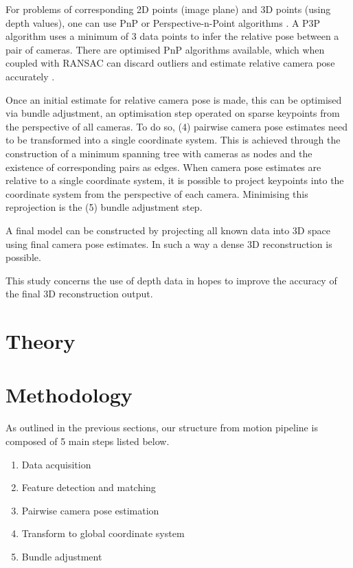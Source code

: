 \documentclass[10pt,twocolumn,letterpaper]{article}
\begin{document}
For problems of corresponding 2D points (image plane) and 3D points (using depth
values), one can use PnP or Perspective-n-Point algorithms \cite{d2013p3p}. A P3P
algorithm uses a minimum of 3 data points to infer the relative pose between a
pair of cameras. There are optimised PnP algorithms available, which when
coupled with RANSAC can discard outliers and estimate relative camera pose
accurately \cite{lepetit2009epnp}.

Once an initial estimate for relative camera pose is made, this can be optimised
via bundle adjustment, an optimisation step operated on sparse keypoints from
the perspective of all cameras. To do so, (4) pairwise camera pose estimates
need to be transformed into a single coordinate system. This is achieved through
the construction of a minimum spanning tree with cameras as nodes and the
existence of corresponding pairs as edges. When camera pose estimates are
relative to a single coordinate system, it is possible to project keypoints into
the coordinate system from the perspective of each camera. Minimising this
reprojection is the (5) bundle adjustment step.

A final model can be constructed by projecting all known data into 3D space
using final camera pose estimates. In such a way a dense 3D reconstruction is
possible.

This study concerns the use of depth data in hopes to improve the accuracy of
the final 3D reconstruction output.



\section{Theory}


\section{Methodology}

As outlined in the previous sections, our structure from motion pipeline is
composed of 5 main steps listed below.

\begin{enumerate}
\item Data acquisition
\item Feature detection and matching
\item Pairwise camera pose estimation
\item Transform to global coordinate system
\item Bundle adjustment
\end{enumerate}
\end{document}
